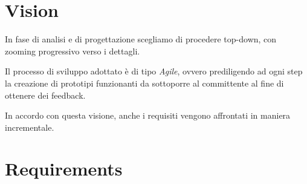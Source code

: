 \documentclass{../llncs}
\newcommand{\fname}[1]{{\small{\color{magenta}\texttt{#1}}}}
\newcommand{\labelsec}[1]{\label{sec:#1}}
\begin{document}
\section{Vision}
\labelsec{vision}

In fase di analisi e di progettazione scegliamo di procedere top-down, con zooming progressivo verso i dettagli.

Il processo di sviluppo adottato è di tipo \emph{Agile}, ovvero prediligendo ad ogni step la creazione di prototipi funzionanti da sottoporre al committente al fine di ottenere dei feedback.

In accordo con questa visione, anche i requisiti vengono affrontati in maniera incrementale.

\section{Requirements}
\labelsec{Requirements}

\end{document}
